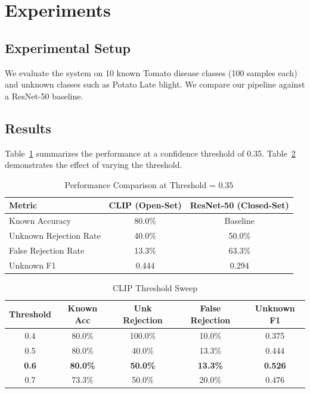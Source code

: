 \documentclass[runningheads]{llncs}
\begin{document}
\section{Experiments}
\subsection{Experimental Setup}
We evaluate the system on 10 known Tomato disease classes (100 samples each) and unknown classes such as Potato Late blight. We compare our pipeline against a ResNet-50 baseline.

\subsection{Results}
Table~\ref{tab:results} summarizes the performance at a confidence threshold of 0.35. Table~\ref{tab:sweep} demonstrates the effect of varying the threshold.

\begin{table}[h]
\centering
\caption{Performance Comparison at Threshold = 0.35}
\label{tab:results}
\begin{tabular}{@{}lcc@{}}
\toprule
Metric & CLIP (Open-Set) & ResNet-50 (Closed-Set) \\ \midrule
Known Accuracy & 80.0\% & Baseline \\
Unknown Rejection Rate & 40.0\% & 50.0\% \\
False Rejection Rate & 13.3\% & 63.3\% \\
Unknown F1 & 0.444 & 0.294 \\ \bottomrule
\end{tabular}
\end{table}

\begin{table}[h]
\centering
\caption{CLIP Threshold Sweep}
\label{tab:sweep}
\begin{tabular}{@{}ccccc@{}}
\toprule
Threshold & Known Acc & Unk Rejection & False Rejection & Unknown F1 \\ \midrule
0.4 & 80.0\% & 100.0\% & 10.0\% & 0.375 \\
0.5 & 80.0\% & 40.0\% & 13.3\% & 0.444 \\
\textbf{0.6} & \textbf{80.0\%} & \textbf{50.0\%} & \textbf{13.3\%} & \textbf{0.526} \\
0.7 & 73.3\% & 50.0\% & 20.0\% & 0.476 \\ \bottomrule
\end{tabular}
\end{table}
\end{document}
